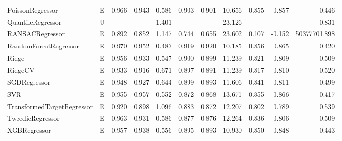\documentclass[final,3p,times,twocolumn]{elsarticle}
\begin{document}
\begin{table}[t!]
\begin{adjustbox}{max width=\textwidth}
\begin{tabular}{llrrrrrrrrr}
        PoissonRegressor & E & 0.966 & 0.943 & 0.586 & 0.903 & 0.901 & 10.656 & 0.855 & 0.857 & 0.446 \\
        QuantileRegressor & U & -- & -- & 1.401 & -- & -- & 23.126 & -- & -- & 0.831 \\
        RANSACRegressor & E & 0.892 & 0.852 & 1.147 & 0.744 & 0.655 & 23.602 & 0.107 & -0.152 & 50377701.898 \\
        RandomForestRegressor & E & 0.970 & 0.952 & 0.483 & 0.919 & 0.920 & 10.185 & 0.856 & 0.865 & 0.420 \\
        Ridge & E & 0.956 & 0.933 & 0.547 & 0.900 & 0.899 & 11.239 & 0.821 & 0.809 & 0.509 \\
        RidgeCV & E & 0.933 & 0.916 & 0.671 & 0.897 & 0.891 & 11.239 & 0.817 & 0.810 & 0.520 \\
        SGDRegressor & E & 0.948 & 0.927 & 0.644 & 0.899 & 0.893 & 11.606 & 0.841 & 0.811 & 0.499 \\
        SVR & E & 0.955 & 0.957 & 0.552 & 0.872 & 0.868 & 13.671 & 0.855 & 0.866 & 0.417 \\
        TransformedTargetRegressor & E & 0.920 & 0.898 & 1.096 & 0.883 & 0.872 & 12.207 & 0.802 & 0.789 & 0.539 \\
        TweedieRegressor & E & 0.963 & 0.931 & 0.586 & 0.877 & 0.876 & 12.264 & 0.836 & 0.806 & 0.509 \\
        XGBRegressor & E & 0.957 & 0.938 & 0.556 & 0.895 & 0.893 & 10.930 & 0.850 & 0.848 & 0.443 \\
        \bottomrule
        \end{tabular}
    \end{adjustbox}
\end{table}
\end{document}
